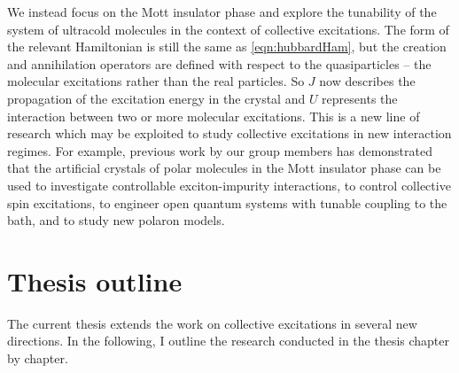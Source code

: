 We instead focus on the Mott insulator phase and explore the tunability of the system of ultracold molecules in the 
context of collective excitations. The form of the relevant Hamiltonian is still the same as \autoref{eqn:hubbardHam}, but the creation
and annihilation operators are defined with respect to the quasiparticles -- the molecular excitations rather than the real 
particles.  So $J$ now describes the propagation of the excitation energy in the crystal and $U$ represents the interaction
between two or more molecular excitations. This is a new line of research which may be exploited to study collective 
excitations in new interaction regimes. For example, previous work by our group members has demonstrated
that the artificial crystals of polar molecules in the Mott insulator phase can be used to investigate controllable exciton-impurity interactions\cite{felipe},
to control collective spin excitations\cite{perez-rios2010}, to engineer open quantum systems with tunable coupling to the bath\cite{felipe-polarons}, and to study new polaron models\cite{felipe-arxive-polaron}. 


\section{Thesis outline}
\label{sec:outline}

The current thesis extends the work on collective excitations in several new directions. In the following, I outline the research conducted in the thesis chapter by chapter. 

